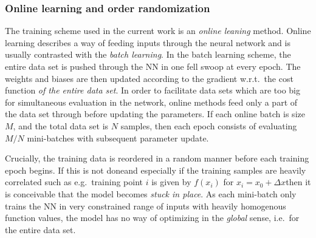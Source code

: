 \documentclass[../../master.tex]{subfiles}
\begin{document}
\subsubsection{Online learning and order randomization}
The training scheme used in the current work is an \emph{online leaning} method. Online learning describes a way of feeding inputs through the neural network and is usually contrasted with the \emph{batch learning}. In the batch learning scheme, the entire data set is pushed through the NN in one fell swoop at every epoch. The weights and biases are then updated according to the gradient w.r.t.\ the cost function \emph{of the entire data set}. In order to facilitate data sets which are too big for simultaneous evaluation in the network, online methods feed only a part of the data set through before updating the parameters. If each online batch is size $M$, and the total data set is $N$ samples, then each epoch consists of evaluating $M/N$ mini-batches with subsequent parameter update. 

Crucially, the training data is reordered in a random manner before each training epoch begins. If this is not done\textemdash and especially if the training samples are heavily correlated such as e.g.\ training point $i$ is given by $f(x_i)$ for $x_i=x_0+\mathit{\Delta}x$\textemdash then it is conceivable that the model becomes \emph{stuck in place}. As each mini-batch only trains the NN in very constrained range of inputs with heavily homogenous function values, the model has no way of optimizing in the \emph{global} sense, i.e.\ for the entire data set. 
\end{document}
